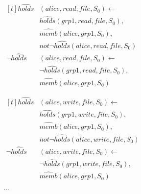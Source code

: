 \documentclass[global,twocolumn,draft]{svjour}
\newenvironment{vexample}
  {\begin{example}\hspace{0.25em}}
  {\end{example}}
\begin{document}
\begin{vexample}
\begin{enumerate}
              \begin{math}
                \begin{aligned}[t]
                  \hat{holds}&(alice, read, file, S_{0}) \leftarrow \\
                  & \hat{holds}(grp1, read, file, S_{0}), \\
                  & \hat{memb}(alice, grp1, S_{0}), \\
                  & not \lnot \hat{holds}(alice, read, file, S_{0}) \\
                  \lnot \hat{holds}&(alice, read, file, S_{0}) \leftarrow \\
                  & \lnot \hat{holds}(grp1, read, file, S_{0}), \\
                  & \hat{memb}(alice, grp1, S_{0})
                \end{aligned}
              \end{math}

              \begin{math}
                \begin{aligned}[t]
                  \hat{holds}&(alice, write, file, S_{0}) \leftarrow \\
                  & \hat{holds}(grp1, write, file, S_{0}), \\
                  & \hat{memb}(alice, grp1, S_{0}), \\
                  & not \lnot \hat{holds}(alice, write, file, S_{0}) \\
                  \lnot \hat{holds}&(alice, write, file, S_{0}) \leftarrow \\
                  & \lnot \hat{holds}(grp1, write, file, S_{0}), \\
                  & \hat{memb}(alice, grp1, S_{0})
                \end{aligned}
              \end{math}

              $\ldots$


\end{enumerate}
\end{vexample}
\end{document}
